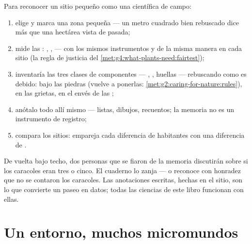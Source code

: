 \begin{method}\label{met:g6:exploring-our-environment:survey}
Para reconocer un sitio pequeño como una científica de campo:
\begin{enumerate}
  \item elige y marca una zona pequeña --- un metro cuadrado bien
        rebuscado dice más que una hectárea vista de pasada;
  \item mide las : , ,  --- con los
        mismos instrumentos y de la misma manera en cada sitio (la
        regla de justicia del \cref{met:g4:what-plants-need:fairtest});
  \item inventaría las tres clases de componentes --- ,
        , huellas --- rebuscando como es debido: bajo
        las piedras (vuelve a ponerlas:
        \cref{met:g2:caring-for-nature:rules}), en las grietas, en el
        envés de las ;
  \item anótalo todo allí mismo --- listas, dibujos, recuentos; la
        memoria no es un instrumento de registro;
  \item compara los sitios: empareja cada diferencia de habitantes con
        una diferencia de .
\end{enumerate}
\end{method}

\begin{remark}\label{rem:g6:exploring-our-environment:records}
De vuelta bajo techo, dos personas que se fiaron de la memoria
discutirán sobre si los caracoles eran tres o cinco. El cuaderno lo
zanja --- o reconoce con honradez que no se contaron los caracoles.
Las anotaciones escritas, hechas en el sitio, son lo que convierte un
paseo en datos; todas las ciencias de este libro funcionan con ellas.
\end{remark}

\section{Un entorno, muchos micromundos}

